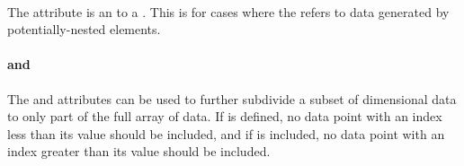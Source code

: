 \begin{blockChanged}
\paragraph*{}
The  attribute is an \SIdRef to a \RepeatedTask.  This is for cases where the \Slice refers to data generated by potentially-nested \RepeatedTask elements.

\paragraph*{ and }
The  and  attributes can be used to further subdivide a subset of dimensional data to only part of the full array of data.  If  is defined, no data point with an index less than its value should be included, and if  is included, no data point with an index greater than its value should be included.

\end{blockChanged}
